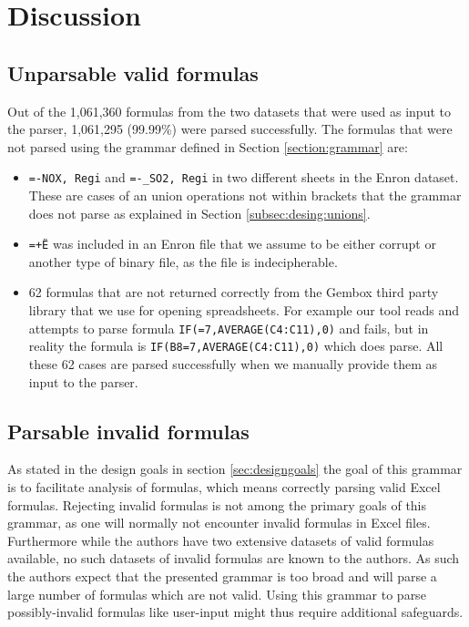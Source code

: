\documentclass[conference]{IEEEtran}
\begin{document}
\section{Discussion}
\label{sec:discussion}

\subsection{Unparsable valid formulas}

Out of the 1,061,360 formulas from the two datasets that were used as input to the parser, 1,061,295 (99.99\%) were parsed successfully.
The formulas that were not parsed using the grammar defined in Section \ref{section:grammar} are:

\begin{itemize}
	\item \texttt{=-NOX, Regi} and \texttt{=-_SO2, Regi} in two different sheets in the Enron dataset. These are cases of an union operations not within brackets that the grammar does not parse as explained in Section \ref{subsec:desing:unions}.
	\item \texttt{=+Ë\textperthousand} was included in an Enron file that we assume to be either corrupt or another type of binary file, as the file is indecipherable.
	\item 62 formulas that are not returned correctly from the Gembox third party library that we use for opening spreadsheets. For example our tool reads and attempts to parse formula \texttt{IF(=7,AVERAGE(C4:C11),0)} and fails, but in reality the formula is \texttt{IF(B8=7,AVERAGE(C4:C11),0)} which does parse. All these 62 cases are parsed successfully when we manually provide them as input to the parser.
\end{itemize}

\subsection{Parsable invalid formulas}

As stated in the design goals in section \ref{sec:designgoals} the goal of this grammar is to facilitate analysis of formulas, which means correctly parsing valid Excel formulas.
Rejecting invalid formulas is not among the primary goals of this grammar, as one will normally not encounter invalid formulas in Excel files.
Furthermore while the authors have two extensive datasets of valid formulas available, no such datasets of invalid formulas are known to the authors.
As such the authors expect that the presented grammar is too broad and will parse a large number of formulas which are not valid.
Using this grammar to parse possibly-invalid formulas like user-input might thus require additional safeguards.
\end{document}

